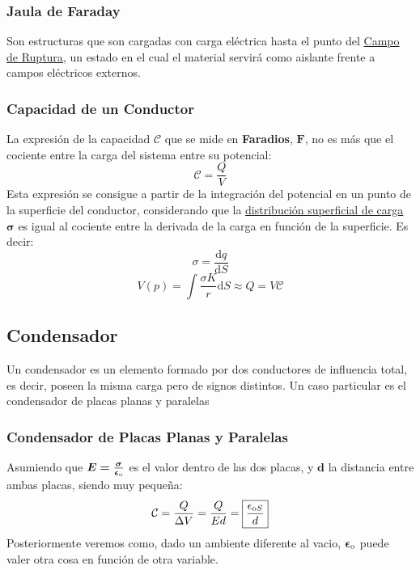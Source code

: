 \subsubsection{Jaula de Faraday}
\noindent Son estructuras que son cargadas con carga eléctrica hasta el punto del \underline{Campo de Ruptura}, un estado en el cual el material servirá como aislante frente a campos eléctricos externos.
\subsubsection{Capacidad de un Conductor}
\noindent La expresión de la capacidad \(\bm{\mathcal{C}}\) que se mide en \textbf{Faradios}, \(\bm{F}\), no es más que el cociente entre la carga del sistema entre su potencial:
\[
        \boxed{\mathcal{C} = \frac{Q}{V}}
\]
Esta expresión se consigue a partir de la integración del potencial en un punto de la superficie del conductor, considerando que la \underline{distribución superficial de carga \(\bm{\sigma}\)} es igual al cociente entre la derivada de la carga en función de la superficie. Es decir:
\[
        \sigma = \frac{\mathrm{d}q}{\mathrm{d}S}
\]
\[
        V(p) = \int \frac{\sigma K}{r} \mathrm{d}S \approx Q = V \mathcal{C}
\]
\subsection{Condensador}
\noindent Un condensador es un elemento formado por dos conductores de influencia total, es decir, poseen la misma carga pero de signos distintos. Un caso particular es el condensador de placas planas y paralelas
\newpage
\subsubsection{Condensador de Placas Planas y Paralelas}
\begin{wrapfigure}{l}{0cm}
        
\end{wrapfigure}
\noindent Asumiendo que \(\bm{E = \frac{\sigma}{\epsilon_{\textnormal{o}}}}\) es el valor dentro de las dos placas, y \(\bm{d}\) la distancia entre ambas placas, siendo muy pequeña:
\[
        \mathcal{C}  = \frac{Q}{\Delta V} = \frac{Q}{Ed} = \boxed{\frac{\epsilon_{\textnormal{o}S}}{d}}
\]
Posteriormente veremos como, dado un ambiente diferente al vacio, \(\bm{\epsilon_{\textnormal{o}}}\) puede valer otra cosa en función de otra variable.
